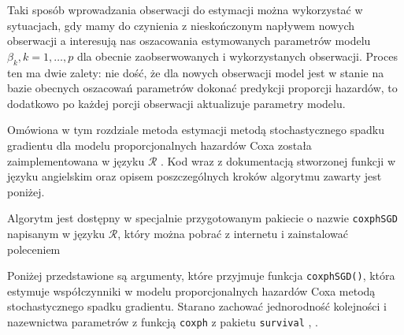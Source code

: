 Taki sposób wprowadzania obserwacji do estymacji można wykorzystać w sytuacjach, gdy mamy do czynienia z nieskończonym napływem nowych obserwacji a interesują nas oszacowania estymowanych parametrów modelu $\beta_k, k=1,\dots,p$ dla obecnie zaobserwowanych i wykorzystanych obserwacji. Proces ten ma dwie zalety: nie dość, że dla nowych obserwacji model jest w stanie na bazie obecnych oszacowań parametrów dokonać predykcji proporcji hazardów, to dodatkowo po każdej porcji obserwacji aktualizuje parametry modelu.

Omówiona w tym rozdziale metoda estymacji metodą stochastycznego spadku gradientu dla modelu proporcjonalnych hazardów Coxa została zaimplementowana w języku $\mathcal{R}$ \cite{programikr}. Kod wraz z dokumentacją stworzonej funkcji w języku angielskim oraz opisem poszczególnych kroków algorytmu zawarty jest poniżej.

\newpage
Algorytm jest dostępny w specjalnie przygotowanym pakiecie o nazwie
\texttt{coxphSGD} napisanym w języku \(\mathcal{R}\), który można pobrać
z internetu i zainstalować poleceniem

\begin{Shaded}
\begin{Highlighting}[]
\NormalTok{(}\NormalTok{) <}\StringTok{ }\NormalTok{) \{}
  \NormalTok{(}\NormalTok{)}
\NormalTok{\}}
\NormalTok{(}\NormalTok{)}
\end{Highlighting}
\end{Shaded}

Poniżej przedstawione są argumenty, które przyjmuje funkcja
\texttt{coxphSGD()}, która estymuje współczynniki w modelu
proporcjonalnych hazardów Coxa metodą stochastycznego spadku gradientu.
Starano zachować jednorodność kolejności i nazewnictwa parametrów z
funkcją \texttt{coxph} z pakietu \texttt{survival} \cite{ther},
\cite{survival}.

